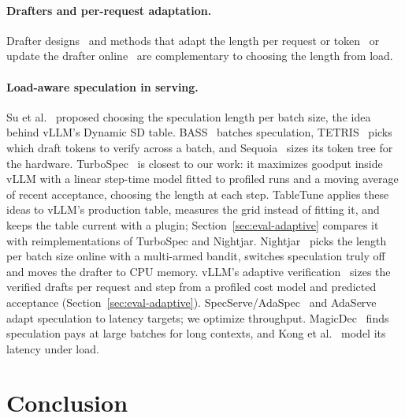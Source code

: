 \documentclass{article}
\newcommand{\sys}{TableTune}
\begin{document}
\paragraph{Drafters and per-request adaptation.} Drafter designs~\cite{li2024eagle,li2024eagle2,li2025eagle3,cai2024medusa,miao2024specinfer,chen2024sequoia,saxena2023prompt,fu2024lookahead,chen2026dflash} and methods that adapt the length per request or token~\cite{mamou2024disco,huang2025specdecpp,agrawal2024adaedl,hou2025banditspec,liu2025pearl,zhang2025svip} or update the drafter online~\cite{liu2024online} are complementary to choosing the length from load.

\paragraph{Load-aware speculation in serving.} Su et al.~\cite{su2023synergy} proposed choosing the speculation length per batch size, the idea behind vLLM's Dynamic SD table. BASS~\cite{qian2024bass} batches speculation, TETRIS~\cite{wu2025tetris} picks which draft tokens to verify across a batch, and Sequoia~\cite{chen2024sequoia} sizes its token tree for the hardware. TurboSpec~\cite{liu2024turbospec} is closest to our work: it maximizes goodput inside vLLM with a linear step-time model fitted to profiled runs and a moving average of recent acceptance, choosing the length at each step. \sys{} applies these ideas to vLLM's production table, measures the grid instead of fitting it, and keeps the table current with a plugin; Section~\ref{sec:eval-adaptive} compares it with reimplementations of TurboSpec and Nightjar. Nightjar~\cite{li2025nightjar} picks the length per batch size online with a multi-armed bandit, switches speculation truly off and moves the drafter to CPU memory. vLLM's adaptive verification~\cite{vllm2026adaptiveverif,vllm2026avnohead} sizes the verified drafts per request and step from a profiled cost model and predicted acceptance (Section~\ref{sec:eval-adaptive}). SpecServe/AdaSpec~\cite{huang2025adaspec} and AdaServe~\cite{li2026adaserve} adapt speculation to latency targets; we optimize throughput. MagicDec~\cite{sadhukhan2025magicdec} finds speculation pays at large batches for long contexts, and Kong et al.~\cite{kong2026latency} model its latency under load.

\section{Conclusion}
\end{document}
